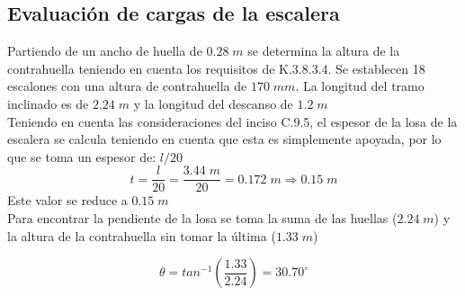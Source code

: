 \documentclass[12pt]{article}
\begin{document}
\subsection{Evaluación de cargas de la escalera}


Partiendo de un ancho de huella de $0.28\;m$ se determina la altura de la contrahuella teniendo en cuenta los requisitos de K.3.8.3.4. Se establecen 18 escalones con una altura de contrahuella de $170\;mm$. La longitud del tramo inclinado es de $2.24\;m$ y la longitud del descanso de $1.2\;m$\\


Teniendo en cuenta las consideraciones del inciso C.9.5, el espesor de la losa de la escalera se calcula teniendo en cuenta que esta es simplemente apoyada, por lo que se toma un espesor de: $l/20$
\begin{equation}
    t=\frac{l}{20}=\frac{3.44\;m}{20}=0.172\;m \Rightarrow 0.15\;m
\end{equation}
Este valor se reduce a $0.15\;m$ \\ %
Para encontrar la pendiente de la losa se toma la suma de las huellas ($2.24\;m$) y la altura de la contrahuella sin tomar la última ($1.33\;m$)

\begin{equation}
    \theta=tan^{-1}\left(\frac{1.33}{2.24}\right)=30.70^{\circ}
\end{equation}
\end{document}
